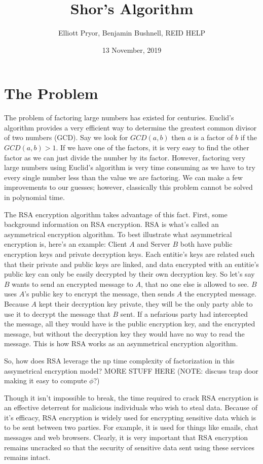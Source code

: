 \documentclass[a4paper]{article}
\title{Shor's Algorithm}
\author{Elliott Pryor, Benjamin Bushnell, REID HELP}
\date{13 November, 2019}
\begin{document}
\maketitle %
\section{The Problem}
The problem of factoring large numbers has existed for centuries. Euclid's algorithm provides a very efficient way to determine the greatest common divisor of two numbers (GCD). Say we look for $GCD(a,b)$ then $a$ is a factor of $b$ if the $GCD(a, b) > 1$. If we have one of the factors, it is very easy to find the other factor as we can just divide the number by its factor. However, factoring very large numbers using Euclid's algorithm is very time consuming as we have to try every single number less than the value we are factoring. We can make a few improvements to our guesses; however, classically this problem cannot be solved in polynomial time.

The RSA encryption algorithm takes advantage of this fact. First, some background information on RSA encryption. RSA is what's called an asymmetrical encryption algorithm. To best illustrate what asymmetrical encryption is, here's an example: Client $A$ and Server $B$ both have public encryption keys and private decryption keys. Each entitie's keys are related such that their private and public keys are linked, and data encrypted with an entitie's public key can only be easily decrypted by their own decryption key. So let's say $B$ wants to send an encrypted message to $A$, that no one else is allowed to see. $B$ uses $A$'s public key to encrypt the message, then sends $A$ the encrypted message. Because $A$ kept their decryption key private, they will be the only party able to use it to decrypt the message that $B$ sent. If a nefarious party had intercepted the message, all they would have is the public encryption key, and the encrypted message, but without the decryption key they would have no way to read the message. This is how RSA works as an asymmetrical encryption algorithm.

So, how does RSA leverage the np time complexity of factorization in this assymetrical encryption model? MORE STUFF HERE (NOTE: discuss trap door making it easy to compute $\phi$?)

Though it isn't impossible to break, the time required to crack RSA encryption is an effective deterrent for malicious individuals who wish to steal data. Because of it's efficacy, RSA encryption is widely used for encrypting sensitive data which is to be sent between two parties. For example, it is used for things like emails, chat messages and web browsers. Clearly, it is very important that RSA encryption remains uncracked so that the security of sensitive data sent using these services remains intact.
\end{document}

